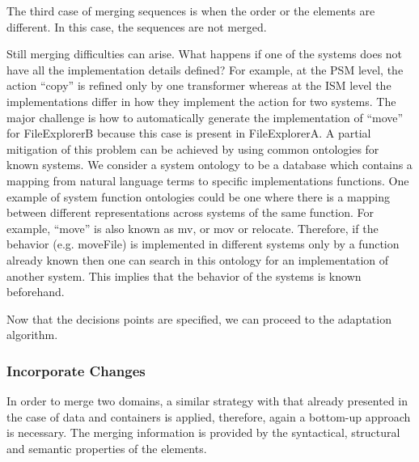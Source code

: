 \documentclass{sig-alternate}
\begin{document}
The third case of merging sequences is when the order or the elements are different.
In this case, the sequences are not merged.

Still merging difficulties can arise. What happens if one of the systems does not have all the implementation details defined?
For example, at the PSM level, the action ``copy'' is refined only by one transformer
whereas at the ISM level the implementations differ in how they implement the action for two systems.
The major challenge is how to automatically generate the implementation of ``move'' for FileExplorerB because this case is present in FileExplorerA. 
A partial mitigation of this problem can be achieved by using common ontologies for known systems.
We consider a system ontology to be a database which contains a mapping from natural language terms to specific implementations functions.
One example of system function ontologies could be one where there is a mapping
between different representations across systems of the same function.
For example, ``move'' is also known as mv, or mov or relocate.
Therefore, if the behavior (e.g. moveFile) is implemented in different systems only by a function already known
then one can search in this ontology for an implementation of another system.
This implies that the behavior of the systems is known beforehand. 

Now that the decisions points are specified, we can proceed to the adaptation algorithm.



\subsubsection{Incorporate Changes}
In order to merge two domains, a similar strategy with that already presented in the case of data and containers is applied, therefore, again a bottom-up approach is necessary.
The merging information is provided by the syntactical, structural and semantic properties of the elements.
\end{document}
